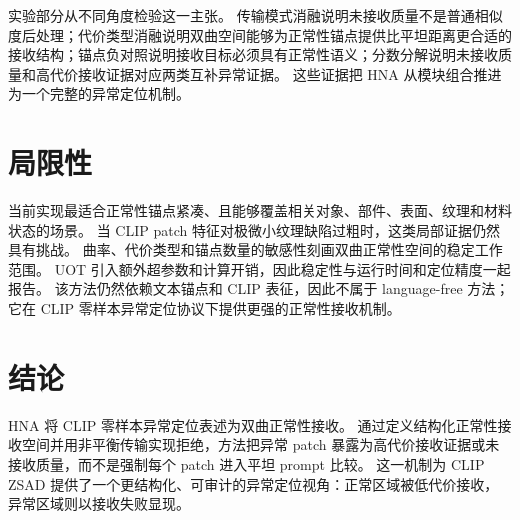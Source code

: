 \documentclass[10pt,fontset=none]{ctexart}
\newcommand{\method}{HNA}
\begin{document}
实验部分从不同角度检验这一主张。
传输模式消融说明未接收质量不是普通相似度后处理；代价类型消融说明双曲空间能够为正常性锚点提供比平坦距离更合适的接收结构；锚点负对照说明接收目标必须具有正常性语义；分数分解说明未接收质量和高代价接收证据对应两类互补异常证据。
这些证据把 \method{} 从模块组合推进为一个完整的异常定位机制。

\section{局限性}

当前实现最适合正常性锚点紧凑、且能够覆盖相关对象、部件、表面、纹理和材料状态的场景。
当 CLIP patch 特征对极微小纹理缺陷过粗时，这类局部证据仍然具有挑战。
曲率、代价类型和锚点数量的敏感性刻画双曲正常性空间的稳定工作范围。
UOT 引入额外超参数和计算开销，因此稳定性与运行时间和定位精度一起报告。
该方法仍然依赖文本锚点和 CLIP 表征，因此不属于 language-free 方法；它在 CLIP 零样本异常定位协议下提供更强的正常性接收机制。

\section{结论}

\method{} 将 CLIP 零样本异常定位表述为双曲正常性接收。
通过定义结构化正常性接收空间并用非平衡传输实现拒绝，方法把异常 patch 暴露为高代价接收证据或未接收质量，而不是强制每个 patch 进入平坦 prompt 比较。
这一机制为 CLIP ZSAD 提供了一个更结构化、可审计的异常定位视角：正常区域被低代价接收，异常区域则以接收失败显现。



\end{document}
